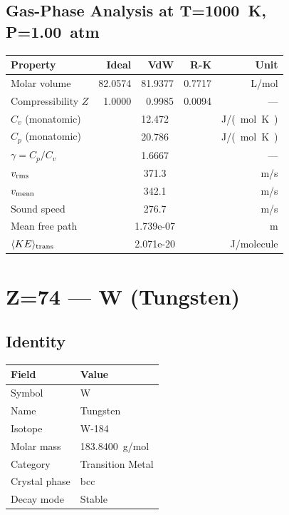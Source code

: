 \documentclass[11pt,a4paper]{article}
\begin{document}
\subsection{Gas-Phase Analysis at T=\SI{1000}{K}, P=\SI{1.00}{atm}}
\begin{tabular}{lrrrr}
  \toprule
  Property & Ideal & VdW & R-K & Unit \\
  \midrule
  Molar volume & 82.0574 & 81.9377 & 0.7717 & \si{L/mol} \\
  Compressibility $Z$ & 1.0000 & 0.9985 & 0.0094 & --- \\
  \midrule
  $C_v$ (monatomic) & \multicolumn{3}{c}{12.472} & \si{J/(mol.K)} \\
  $C_p$ (monatomic) & \multicolumn{3}{c}{20.786} & \si{J/(mol.K)} \\
  $\gamma = C_p/C_v$ & \multicolumn{3}{c}{1.6667} & --- \\
  $v_{\rm rms}$ & \multicolumn{3}{c}{371.3} & \si{m/s} \\
  $v_{\rm mean}$ & \multicolumn{3}{c}{342.1} & \si{m/s} \\
  Sound speed & \multicolumn{3}{c}{276.7} & \si{m/s} \\
  Mean free path & \multicolumn{3}{c}{1.739e-07} & \si{m} \\
  $\langle KE \rangle_{\rm trans}$ & \multicolumn{3}{c}{2.071e-20} & \si{J/molecule} \\
  \bottomrule
\end{tabular}

\newpage

\section{Z=74 --- W (Tungsten)}
\label{sec:Z74}

\subsection{Identity}
\begin{tabular}{ll}
  \toprule
  Field & Value \\
  \midrule
  Symbol & W \\
  Name & Tungsten \\
  Isotope & W-184 \\
  Molar mass & \SI{183.8400}{g/mol} \\
  Category & Transition Metal \\
  Crystal phase & bcc \\
  Decay mode & Stable \\
  \bottomrule
\end{tabular}
\end{document}
